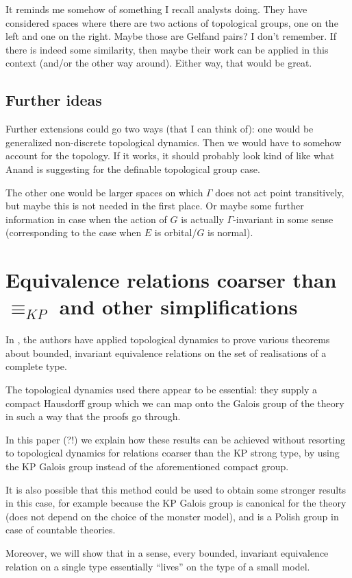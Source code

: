 \documentclass[final,a4paper,12pt]{amsart}
\theoremstyle{remark}
\theoremstyle{definition}
\newcommand{\KPeq}{\mathrel{\equiv_{KP}}}
\let\Gamma\varGamma
\begin{document}
	It reminds me somehow of something I recall analysts doing. They have considered spaces where there are two actions of topological groups, one on the left and one on the right. Maybe those are Gelfand pairs? I don't remember. If there is indeed some similarity, then maybe their work can be applied in this context (and/or the other way around). Either way, that would be great.
	
	\subsection{Further ideas}
	Further extensions could go two ways (that I can think of): one would be generalized non-discrete topological dynamics. Then we would have to somehow account for the topology. If it works, it should probably look kind of like what Anand is suggesting for the definable topological group case.
	
	The other one would be larger spaces on which $\Gamma$ does not act point transitively, but maybe this is not needed in the first place. Or maybe some further information in case when the action of $G$ is actually $\Gamma$-invariant in some sense (corresponding to the case when $E$ is orbital/$G$ is normal).
	
	\section{Equivalence relations coarser than $\KPeq$ and other simplifications}
	In \cite{KPR}, the authors have applied topological dynamics to prove various theorems about bounded, invariant equivalence relations on the set of realisations of a complete type.
	
	The topological dynamics used there appear to be essential: they supply a compact Hausdorff group which we can map onto the Galois group of the theory in such a way that the proofs go through.
	
	In this paper (?!) we explain how these results can be achieved without resorting to topological dynamics for relations coarser than the KP strong type, by using the KP Galois group instead of the aforementioned compact group.
	
	It is also possible that this method could be used to obtain some stronger results in this case, for example because the KP Galois group is canonical for the theory (does not depend on the choice of the monster model), and is a Polish group in case of countable theories.
	
	Moreover, we will show that in a sense, every bounded, invariant equivalence relation on a single type essentially ``lives'' on the type of a small model.
	
\end{document}
